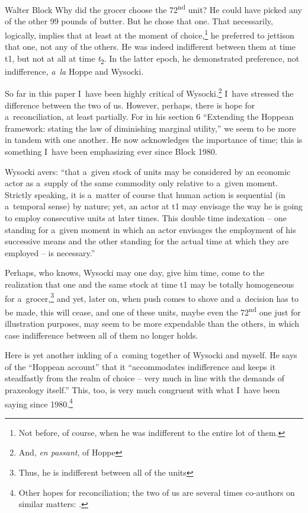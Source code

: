 \begin{artengenv}{Walter Block}
Why did the grocer choose the 72\textsuperscript{nd} unit? He could have picked any of the other 99 pounds of butter. But he chose that one. That necessarily, logically, implies that at least at the moment of choice,\footnote{Not before, of course, when he was indifferent to the entire lot of them.} he preferred to jettison that one, not any of the others. He was indeed indifferent between them at time t1, but not at all at time \textit{t}\textsubscript{2}. In the latter epoch, he demonstrated preference, not indifference, \textit{a~la} Hoppe and Wysocki.

So far in this paper I~have been highly critical of Wysocki.\footnote{And, \textit{en passant}, of Hoppe} I~have stressed the difference between the two of us. However, perhaps, there is hope for a~reconciliation, at least partially. For in his section 6 ``Extending the Hoppean framework: stating the law of diminishing marginal utility,'' we seem to be more in tandem with one another. He now acknowledges the importance of time; this is something I~have been emphasizing ever since Block 1980.

Wysocki avers: ``that a~given stock of units may be considered by an economic actor as a~supply of the same commodity only relative to a~given moment. Strictly speaking, it is a~matter of course that human action is sequential (in a~temporal sense) by nature; yet, an actor at t1 may envisage the way he is going to employ consecutive units at later times. This double time indexation -- one standing for a~given moment in which an actor envisages the employment of his successive means and the other standing for the actual time at which they are employed -- is necessary.''

Perhaps, who knows, Wysocki may one day, give him time, come to the realization that one and the same stock at time t1 may be totally homogeneous for a~grocer,\footnote{Thus, he is indifferent between all of the units} and yet, later on, when push comes to shove and a~decision has to be made, this will cease, and one of these units, maybe even the 72\textsuperscript{nd} one just for illustration purposes, may seem to be more expendable than the others, in which case indifference between all of them no longer holds.

Here is yet another inkling of a~coming together of Wysocki and myself. He says of the ``Hoppean account'' that it ``accommodates indifference and keeps it steadfastly from the realm of choice -- very much in line with the demands of praxeology itself.'' This, too, is very much congruent with what I~have been saying since 1980.\footnote{Other hopes for reconciliation; the two of us are several times co-authors on similar matters:
\parencites[][]{wysocki_analysis_2018}[][]{wysocki_homogeneity_2019}.%
}


\end{artengenv}
